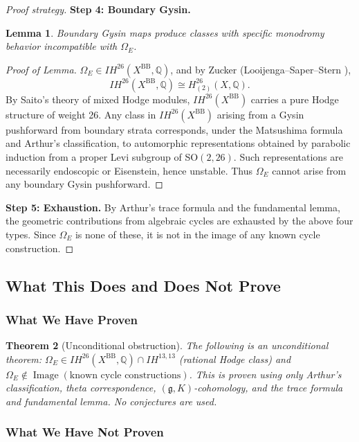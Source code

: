 \documentclass[12pt]{amsart}
\newtheorem{theorem}{Theorem}[section]
\newtheorem{lemma}[theorem]{Lemma}
\theoremstyle{definition}
\DeclareMathOperator\Image{Image}
\newcommand{\Q}{\mathbb{Q}}
\newcommand{\IH}{\mathit{IH}}
\begin{document}
\begin{proof}[Proof strategy]
\textbf{Step 4: Boundary Gysin.}
\begin{lemma}
Boundary Gysin maps produce classes with specific monodromy behavior incompatible with $\Omega_E$.
\end{lemma}
\begin{proof}[Proof of Lemma] 
$\Omega_E\in \IH^{26}(X^\mathrm{BB},\Q)$, and by Zucker (Looijenga–Saper–Stern \cite{Looijenga-Saper-Stern}),  $$\IH^{26}(X^\mathrm{BB},\mathbb{Q})\cong H^{26}_{(2)}(X,\Q).$$
By Saito’s theory of mixed Hodge modules, $\IH^{26}(X^\mathrm{BB})$ carries a pure Hodge structure of weight 26.
Any class in $\IH^{26}(X^\mathrm{BB})$ arising from a Gysin pushforward from boundary strata corresponds, under the Matsushima formula and Arthur’s classification, to automorphic representations obtained by parabolic induction from a proper Levi subgroup of SO$(2,26)$.
Such representations are necessarily endoscopic or Eisenstein, hence unstable. Thus $\Omega_E$ cannot arise from any boundary Gysin pushforward. 
\end{proof}

\textbf{Step 5: Exhaustion.} By Arthur's trace formula and the fundamental lemma, the geometric contributions from algebraic cycles are exhausted by the above four types. Since $\Omega_E$ is none of these, it is not in the image of any known cycle construction.
\end{proof}

\subsection{What This Does and Does Not Prove}

\subsubsection{What We Have Proven}

\begin{theorem}[Unconditional obstruction]
The following is an unconditional theorem: $\Omega_E \in \IH^{26}(X^{\mathrm{BB}}, \Q) \cap \IH^{13,13}$ (rational Hodge class) and $\Omega_E \notin \Image(\text{known cycle constructions})$. This is proven using only Arthur's classification, theta correspondence, $({\mathfrak g}, K)$-cohomology, and the trace formula and fundamental lemma. No conjectures are used.
\end{theorem}

\subsubsection{What We Have Not Proven}
\end{document}
